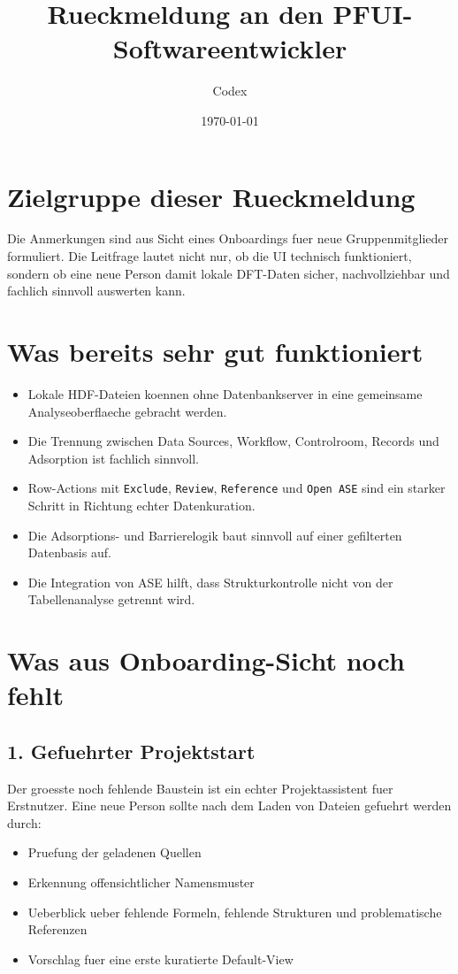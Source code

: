 \documentclass[11pt,a4paper]{article}
\title{Rueckmeldung an den PFUI-Softwareentwickler}
\author{Codex}
\date{\today}
\begin{document}
\maketitle

\section*{Zielgruppe dieser Rueckmeldung}
Die Anmerkungen sind aus Sicht eines Onboardings fuer neue Gruppenmitglieder formuliert. Die Leitfrage lautet nicht nur, ob die UI technisch funktioniert, sondern ob eine neue Person damit lokale DFT-Daten sicher, nachvollziehbar und fachlich sinnvoll auswerten kann.

\section*{Was bereits sehr gut funktioniert}
\begin{itemize}
  \item Lokale HDF-Dateien koennen ohne Datenbankserver in eine gemeinsame Analyseoberflaeche gebracht werden.
  \item Die Trennung zwischen Data Sources, Workflow, Controlroom, Records und Adsorption ist fachlich sinnvoll.
  \item Row-Actions mit \texttt{Exclude}, \texttt{Review}, \texttt{Reference} und \texttt{Open ASE} sind ein starker Schritt in Richtung echter Datenkuration.
  \item Die Adsorptions- und Barrierelogik baut sinnvoll auf einer gefilterten Datenbasis auf.
  \item Die Integration von ASE hilft, dass Strukturkontrolle nicht von der Tabellenanalyse getrennt wird.
\end{itemize}

\section*{Was aus Onboarding-Sicht noch fehlt}
\subsection*{1. Gefuehrter Projektstart}
Der groesste noch fehlende Baustein ist ein echter Projektassistent fuer Erstnutzer. Eine neue Person sollte nach dem Laden von Dateien gefuehrt werden durch:
\begin{itemize}
  \item Pruefung der geladenen Quellen
  \item Erkennung offensichtlicher Namensmuster
  \item Ueberblick ueber fehlende Formeln, fehlende Strukturen und problematische Referenzen
  \item Vorschlag fuer eine erste kuratierte Default-View
\end{itemize}
\end{document}
